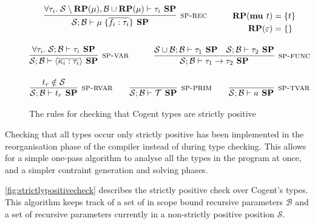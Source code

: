 \begin{figure}
    \centering
    \begin{gather*}
    \infer[\textsc{sp-rec}]{
        \mathcal{S}; \mathcal{B} \vdash \mu\; \{\overline { f_i : \tau_i } \} \textbf{ SP}
    }{
        \forall \tau_i.\; \mathcal{S}\setminus \textbf{RP}(\mu), \mathcal{B} \cup \textbf{RP}(\mu) \vdash \tau_i \textbf{ SP}
    }
    \hspace{3em}
    \begin{split}
        \textbf{RP}(\textbf{mu } t) &= \{t\} \\
        \textbf{RP}(\varepsilon) &= \{\}
    \end{split} \\[10pt]
    \infer[\textsc{sp-var}]{
        \mathcal{S}; \mathcal{B} \vdash \langle\overline{\kappa_i : \tau_i}\rangle \textbf{ SP}
    }{
        \forall \tau_i.\; \mathcal{S}; \mathcal{B} \vdash \tau_i \textbf{ SP}
    }
    \hspace{3em}
    \infer[\textsc{sp-func}]{
        \mathcal{S}; \mathcal{B} \vdash \tau_1 \rightarrow \tau_2 \textbf{ SP}
    }{
        \mathcal{S} \cup \mathcal{B}; \mathcal{B} \vdash \tau_1 \textbf{ SP}
        &
        \mathcal{S}; \mathcal{B} \vdash \tau_2 \textbf{ SP}
    } \\[10pt]
    \infer[\textsc{sp-rvar}]{
        \mathcal{S}; \mathcal{B} \vdash t_r \textbf{ SP}
    }{
        t_r \notin \mathcal{S}
    }
    \hspace{2em}
    \infer[\textsc{sp-prim}]{
        \mathcal{S}; \mathcal{B} \vdash \mathcal{T} \textbf{ SP}
    }{}
    \hspace{2em}
    \infer[\textsc{sp-tvar}]{
        \mathcal{S}; \mathcal{B} \vdash a \textbf{ SP}
    }{}
    \end{gather*}
    \caption{The rules for checking that Cogent types are strictly positive}
    \label{fig:strictlypositivecheck}
\end{figure}

Checking that all types occur only strictly positive has been implemented in the reorganisation phase of the compiler
instead of during type checking. This allows for a simple one-pass algorithm to analyse all the types in the program
at once, and a simpler contraint generation and solving phases.

\autoref{fig:strictlypositivecheck} describes the strictly positive check over Cogent's types.
This algorithm keeps track of a set of in scope bound recursive parameters $\mathcal{B}$ and a set of recursive
parameters currently in a non-strictly positive position $\mathcal{S}$.

